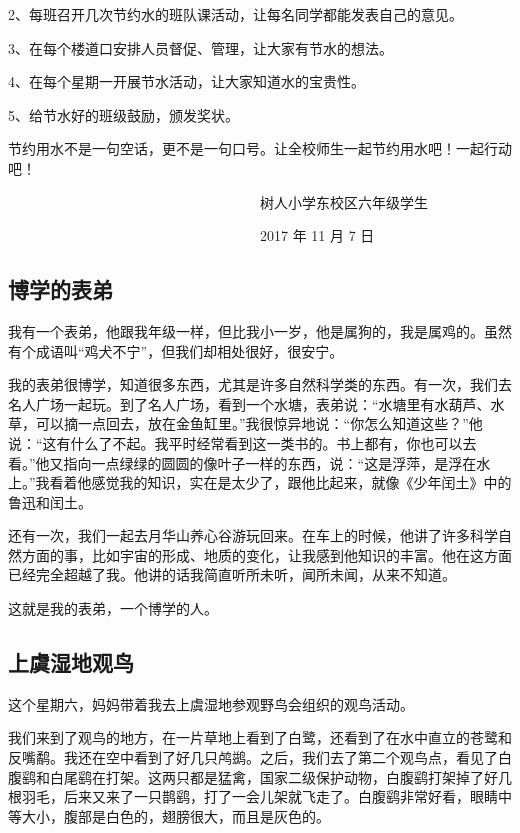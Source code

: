 \documentclass[UTF8,a4paper,titlepage,twoside,10.5pt]{article}
\begin{document}
2、每班召开几次节约水的班队课活动，让每名同学都能发表自己的意见。

3、在每个楼道口安排人员督促、管理，让大家有节水的想法。

4、在每个星期一开展节水活动，让大家知道水的宝贵性。

5、给节水好的班级鼓励，颁发奖状。

节约用水不是一句空话，更不是一句口号。让全校师生一起节约用水吧！一起行动吧！

　　　　　　　　　　　　　　　　　　树人小学东校区六年级学生

　　　　　　　　　　　　　　　　　　2017 年 11 月 7 日

\subsection{博学的表弟}
\label{sec:org3c9c504}

我有一个表弟，他跟我年级一样，但比我小一岁，他是属狗的，我是属鸡的。虽然有个成语叫“鸡犬不宁”，但我们却相处很好，很安宁。

我的表弟很博学，知道很多东西，尤其是许多自然科学类的东西。有一次，我们去名人广场一起玩。到了名人广场，看到一个水塘，表弟说：“水塘里有水葫芦、水草，可以摘一点回去，放在金鱼缸里。”我很惊异地说：“你怎么知道这些？”他说：“这有什么了不起。我平时经常看到这一类书的。书上都有，你也可以去看。”他又指向一点绿绿的圆圆的像叶子一样的东西，说：“这是浮萍，是浮在水上。”我看着他感觉我的知识，实在是太少了，跟他比起来，就像《少年闰土》中的鲁迅和闰土。

还有一次，我们一起去月华山养心谷游玩回来。在车上的时候，他讲了许多科学自然方面的事，比如宇宙的形成、地质的变化，让我感到他知识的丰富。他在这方面已经完全超越了我。他讲的话我简直听所未听，闻所未闻，从来不知道。

这就是我的表弟，一个博学的人。

\subsection{上虞湿地观鸟}
\label{sec:org4545b3c}

这个星期六，妈妈带着我去上虞湿地参观野鸟会组织的观鸟活动。

我们来到了观鸟的地方，在一片草地上看到了白鹭，还看到了在水中直立的苍鹭和反嘴鹬。我还在空中看到了好几只鸬鹚。之后，我们去了第二个观鸟点，看见了白腹鹞和白尾鹞在打架。这两只都是猛禽，国家二级保护动物，白腹鹞打架掉了好几根羽毛，后来又来了一只鹊鹞，打了一会儿架就飞走了。白腹鹞非常好看，眼睛中等大小，腹部是白色的，翅膀很大，而且是灰色的。
\end{document}
